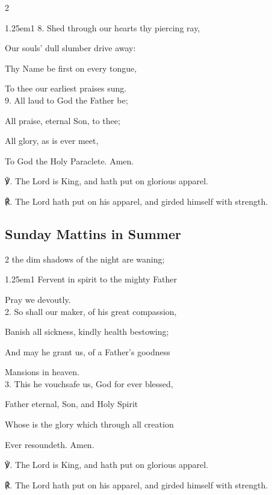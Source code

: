 \begin{multicols}{2}
\begin{hangparas}{1.25em}{1}
8. Shed through our hearts thy piercing ray,

Our souls' dull slumber drive away:

Thy Name be first on every tongue,

To thee our earliest praises sung.\\

9. All laud to God the Father be;

All praise, eternal Son, to thee;

All glory, as is ever meet,

To God the Holy Paraclete. Amen.
	
\end{hangparas}

℣. The Lord is King, and hath put on glorious apparel.

℟. The Lord hath put on his apparel, and girded himself with strength.

\fussy
\end{multicols}

\clearpage
\subsection{Sunday Mattins in Summer}\label{SundayMattinsSummer}

\begin{multicols}{2}
\sloppy
{} the dim shadows of the night are waning; 


\begin{hangparas}{1.25em}{1}
Fervent in spirit to the mighty Father 

Pray we devoutly.\\

2. So shall our maker, of his great compassion, 

Banish all sickness, kindly health bestowing; 

And may he grant us, of a Father's goodness 

Mansions in heaven.\\

3. This he vouchsafe us, God for ever blessed, 

Father eternal, Son, and Holy Spirit 

Whose is the glory which through all creation 

Ever resoundeth. Amen.\\
\end{hangparas}

℣. The Lord is King, and hath put on glorious apparel.

℟. The Lord hath put on his apparel, and girded himself with strength.

\fussy
\end{multicols}


